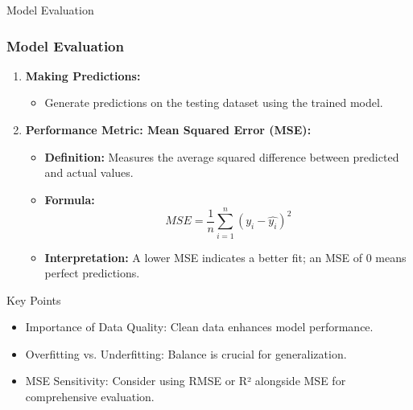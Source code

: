 \documentclass[aspectratio=169]{beamer}
\begin{document}
\begin{frame}[fragile]{Model Evaluation}
    \frametitle{Model Evaluation}
    \begin{enumerate}
        \item \textbf{Making Predictions:}
            \begin{itemize}
                \item Generate predictions on the testing dataset using the trained model.
            \end{itemize}

        \item \textbf{Performance Metric: Mean Squared Error (MSE):}
            \begin{itemize}
                \item \textbf{Definition:} Measures the average squared difference between predicted and actual values.
                \item \textbf{Formula:} \begin{equation}
                    MSE = \frac{1}{n} \sum_{i=1}^n (y_i - \hat{y_i})^2
                \end{equation}
                \item \textbf{Interpretation:} A lower MSE indicates a better fit; an MSE of 0 means perfect predictions.
            \end{itemize}
    \end{enumerate}

    \begin{block}{Key Points}
        \begin{itemize}
            \item Importance of Data Quality: Clean data enhances model performance.
            \item Overfitting vs. Underfitting: Balance is crucial for generalization.
            \item MSE Sensitivity: Consider using RMSE or R² alongside MSE for comprehensive evaluation.
        \end{itemize}
    \end{block}
\end{frame}
\end{document}

